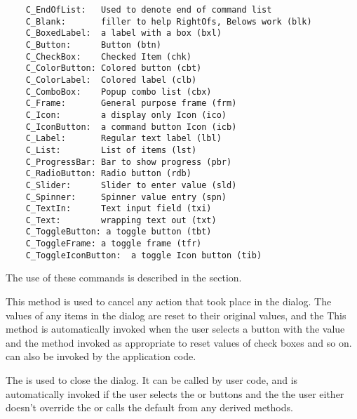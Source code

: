 \footnotesize
\begin{verbatim}
    C_EndOfList:   Used to denote end of command list
    C_Blank:       filler to help RightOfs, Belows work (blk)
    C_BoxedLabel:  a label with a box (bxl)
    C_Button:      Button (btn)
    C_CheckBox:    Checked Item (chk)
    C_ColorButton: Colored button (cbt)
    C_ColorLabel:  Colored label (clb)
    C_ComboBox:    Popup combo list (cbx)
    C_Frame:       General purpose frame (frm)
    C_Icon:        a display only Icon (ico)
    C_IconButton:  a command button Icon (icb)
    C_Label:       Regular text label (lbl)
    C_List:        List of items (lst)
    C_ProgressBar: Bar to show progress (pbr)
    C_RadioButton: Radio button (rdb)
    C_Slider:      Slider to enter value (sld)
    C_Spinner:     Spinner value entry (spn)
    C_TextIn:      Text input field (txi)
    C_Text:        wrapping text out (txt)
    C_ToggleButton: a toggle button (tbt)
    C_ToggleFrame: a toggle frame (tfr)
    C_ToggleIconButton:  a toggle Icon button (tib)
\end{verbatim}
\normalfont\normalsize

The use of these commands is described in the 
section.


This method is used to cancel any action that took place in the
dialog.  The values of any items in the dialog are reset to their
original values, and the  This method is automatically invoked
when the user selects a button with the value 
and the  method invoked as appropriate to
reset values of check boxes and so on.  can
also be invoked by the application code.


The  is used to close the dialog. It can be
called by user code, and is automatically invoked if the user
selects the  or  buttons and the the
user either doesn't override the  or calls
the default  from any derived 
methods.


